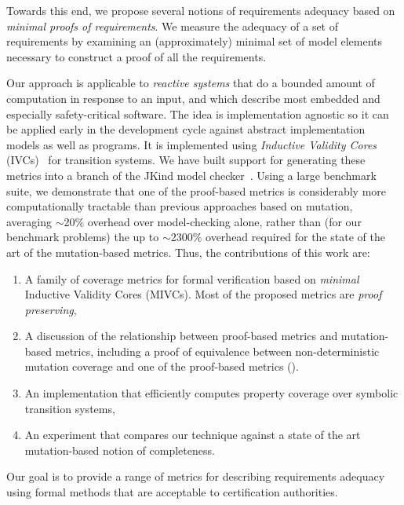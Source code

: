 \noindent Towards this end, we propose several notions of requirements adequacy based on {\em minimal proofs of requirements}.  We measure the adequacy of a set of requirements by examining an (approximately) minimal set of model elements necessary to construct a proof of all the requirements.  

Our approach is applicable to {\em reactive systems} that do a bounded amount of computation in response to an input, and which describe most embedded and especially safety-critical software.  The idea is implementation agnostic so it can be applied early in the development cycle against abstract implementation models as well as programs.  It is implemented using {\em Inductive Validity Cores} (IVCs)~\cite{Ghass16} for transition systems.
We have built support for generating these metrics into a branch of the JKind model checker~\cite{jkind}.  Using a large benchmark suite, we demonstrate that one of the proof-based metrics is considerably more computationally tractable than previous approaches based on mutation, averaging ${\sim}$20\% overhead over model-checking alone, rather than (for our benchmark problems) the up to ${\sim}$2300\% overhead required for the state of the art of the mutation-based metrics.  
Thus, the contributions of this work are:
\begin{enumerate}
\item A family of coverage metrics for formal verification based on \emph{minimal} Inductive Validity Cores (MIVCs).  Most of the proposed metrics are {\em proof preserving},
\item A discussion of the relationship between proof-based metrics and mutation-based metrics, including a proof of equivalence between non-deterministic mutation coverage and one of the proof-based metrics (\mustcov).
\item An implementation that efficiently computes property coverage over symbolic transition systems,
\item An experiment that compares our technique against a state of the art mutation-based notion of completeness.
\end{enumerate}
\vspace{-0.01in}
\noindent Our goal is to provide a range of metrics for describing requirements adequacy using formal methods that are acceptable to certification authorities.  %



